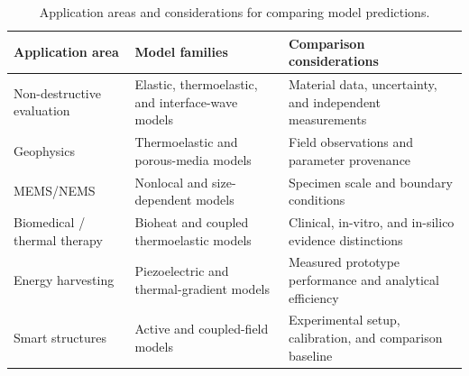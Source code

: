 \begin{table}[htbp]
\centering
\small
\caption{Application areas and considerations for comparing model predictions.}
\label{tab:T8-applications}
\begin{tabularx}{\textwidth}{@{}p{2.6cm}XX@{}}
\toprule
\textbf{Application area} & \textbf{Model families} & \textbf{Comparison considerations} \\
\midrule
Non-destructive evaluation & Elastic, thermoelastic, and interface-wave models & Material data, uncertainty, and independent measurements \\
Geophysics & Thermoelastic and porous-media models & Field observations and parameter provenance \\
MEMS/NEMS & Nonlocal and size-dependent models & Specimen scale and boundary conditions \\
Biomedical / thermal therapy & Bioheat and coupled thermoelastic models & Clinical, in-vitro, and in-silico evidence distinctions \\
Energy harvesting & Piezoelectric and thermal-gradient models & Measured prototype performance and analytical efficiency \\
Smart structures & Active and coupled-field models & Experimental setup, calibration, and comparison baseline \\
\bottomrule
\end{tabularx}
\par{}
\end{table}
